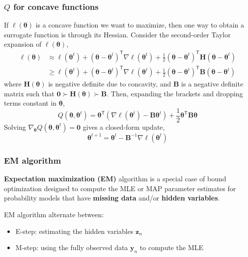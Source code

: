 \documentclass[11pt]{article}
\begin{document}
\subsubsection{$Q$ for concave functions}
If $\ell(\boldsymbol{\theta})$ is a concave function we want to maximize, then one way to obtain a surrogate function is through its Hessian.
Consider the second-order Taylor expansion of $\ell(\boldsymbol{\theta})$,
\[
\begin{aligned}
    \ell(\boldsymbol{\theta}) &\approx \ell(\boldsymbol{\theta}^t) + (\boldsymbol{\theta} - \boldsymbol{\theta}^t)^{\mathsf{T}} \nabla \ell(\boldsymbol{\theta}^t) + \frac{1}{2} (\boldsymbol{\theta} - \boldsymbol{\theta}^t)^{\mathsf{T}} \mathbf{H} (\boldsymbol{\theta} - \boldsymbol{\theta}^t) \\
    &\geq \ell(\boldsymbol{\theta}^t) + (\boldsymbol{\theta} - \boldsymbol{\theta}^t)^{\mathsf{T}} \nabla \ell(\boldsymbol{\theta}^t) + \frac{1}{2} (\boldsymbol{\theta} - \boldsymbol{\theta}^t)^{\mathsf{T}} \mathbf{B} (\boldsymbol{\theta} - \boldsymbol{\theta}^t) 
\end{aligned}
\]
where $\mathbf{H}(\boldsymbol{\theta})$ is negative definite due to concavity, and $\mathbf{B}$ is a negative definite matrix such that $\mathbf{0} \succ \mathbf{H}(\boldsymbol{\theta}) \succ \mathbf{B}$.
Then, expanding the brackets and dropping terms constant in $\boldsymbol{\theta}$,
\[
Q(\boldsymbol{\theta}, \boldsymbol{\theta}^t) = \boldsymbol{\theta}^{\mathsf{T}} (\nabla \ell(\boldsymbol{\theta}^t) - \mathbf{B} \boldsymbol{\theta}^t) + \frac{1}{2} \boldsymbol{\theta}^{\mathsf{T}} \mathbf{B} \boldsymbol{\theta}
\]
Solving $\nabla_{\boldsymbol{\theta}}Q(\boldsymbol{\theta}, \boldsymbol{\theta}^t) = \boldsymbol{0}$ gives a closed-form update,
\[
\boldsymbol{\theta}^{t+1} = \boldsymbol{\theta}^t - \mathbf{B}^{-1} \nabla \ell(\boldsymbol{\theta}^t)
\]

\subsubsection{EM algorithm}
\textbf{Expectation maximization (EM)} algorithm is a special case of bound optimization 
designed to compute the MLE or MAP parameter estimates for probability models that have \textbf{missing data} and/or \textbf{hidden variables}.

EM algorithm alternate between:
\begin{itemize}
    \item E-step: estimating the hidden variables $\boldsymbol{z}_n$
    \item M-step: using the fully observed data $\boldsymbol{y}_n$ to compute the MLE
\end{itemize}
\end{document}
